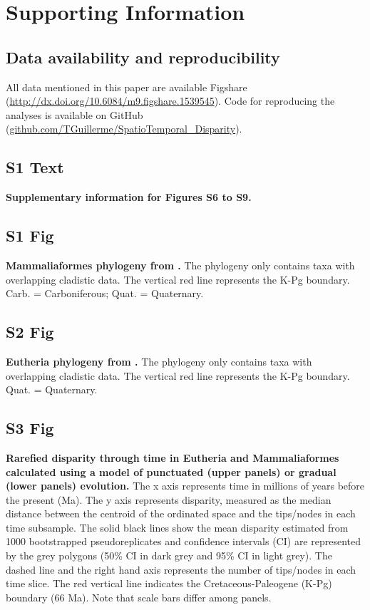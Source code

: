 \documentclass[10pt,letterpaper]{article}
\begin{document}
\section*{Supporting Information}

\subsection*{Data availability and reproducibility} %
All data mentioned in this paper are available Figshare (\url{http://dx.doi.org/10.6084/m9.figshare.1539545}).
Code for reproducing the analyses is available on GitHub (\url{github.com/TGuillerme/SpatioTemporal_Disparity}).

\subsection*{S1 Text}
\label{S1_Text}
{\bf Supplementary information for Figures S6 to S9.}

\subsection*{S1 Fig}
\label{S1_Fig}
{\bf Mammaliaformes phylogeny from \cite{Slater2012MEE}.} The phylogeny only contains taxa with overlapping cladistic data. The vertical red line represents the K-Pg boundary. Carb. = Carboniferous; Quat. = Quaternary.

\subsection*{S2 Fig}
\label{S2_Fig}
{\bf Eutheria phylogeny from \cite{beckancient2014}.} The phylogeny only contains taxa with overlapping cladistic data. The vertical red line represents the K-Pg boundary. Quat. = Quaternary.

\subsection*{S3 Fig}
\label{S3_Fig}
{\bf Rarefied disparity through time in Eutheria and Mammaliaformes calculated using a model of punctuated (upper panels) or gradual (lower panels) evolution.} The x axis represents time in millions of years before the present (Ma). The y axis represents disparity, measured as the median distance between the centroid of the ordinated space and the tips/nodes in each time subsample. The solid black lines show the mean disparity estimated from 1000 bootstrapped pseudoreplicates and confidence intervals (CI) are represented by the grey polygons (50\% CI in dark grey and 95\% CI in light grey). The dashed line and the right hand axis represents the number of tips/nodes in each time slice. The red vertical line indicates the Cretaceous-Paleogene (K-Pg) boundary (66 Ma). Note that scale bars differ among panels.
\end{document}
